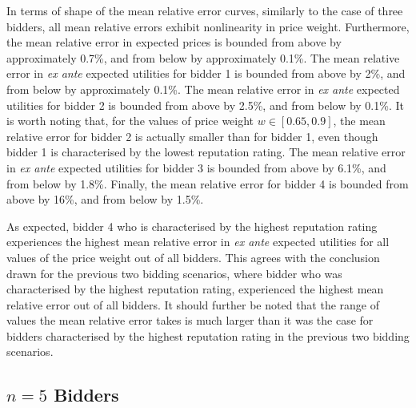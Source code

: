 In terms of shape of the mean relative error curves, similarly to the case of three bidders, all mean relative errors exhibit nonlinearity in price weight. Furthermore, the mean relative error in expected prices is bounded from above by approximately 0.7\%, and from below by approximately 0.1\%. The mean relative error in \emph{ex ante} expected utilities for bidder 1 is bounded from above by 2\%, and from below by approximately 0.1\%. The mean relative error in \emph{ex ante} expected utilities for bidder 2 is bounded from above by 2.5\%, and from below by 0.1\%. It is worth noting that, for the values of price weight $w\in [0.65, 0.9]$, the mean relative error for bidder 2 is actually smaller than for bidder 1, even though bidder 1 is characterised by the lowest reputation rating. The mean relative error in \emph{ex ante} expected utilities for bidder 3 is bounded from above by 6.1\%, and from below by 1.8\%. Finally, the mean relative error for bidder 4 is bounded from above by 16\%, and from below by 1.5\%.

As expected, bidder 4 who is characterised by the highest reputation rating experiences the highest mean relative error in \emph{ex ante} expected utilities for all values of the price weight out of all bidders. This agrees with the conclusion drawn for the previous two bidding scenarios, where bidder who was characterised by the highest reputation rating, experienced the highest mean relative error out of all bidders. It should further be noted that the range of values the mean relative error takes is much larger than it was the case for bidders characterised by the highest reputation rating in the previous two bidding scenarios.

\subsection{$n=5$ Bidders} %
\label{sub:n_5_bidders_approximation}


